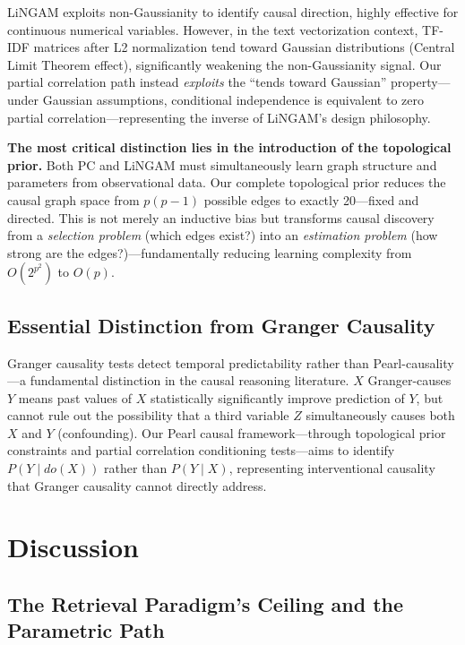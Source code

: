 \documentclass[11pt,a4paper]{article}
\begin{document}
LiNGAM exploits non-Gaussianity to identify causal direction, highly effective for continuous numerical variables. However, in the text vectorization context, TF-IDF matrices after L2 normalization tend toward Gaussian distributions (Central Limit Theorem effect), significantly weakening the non-Gaussianity signal. Our partial correlation path instead \textit{exploits} the ``tends toward Gaussian'' property---under Gaussian assumptions, conditional independence is equivalent to zero partial correlation---representing the inverse of LiNGAM's design philosophy.

\textbf{The most critical distinction lies in the introduction of the topological prior.} Both PC and LiNGAM must simultaneously learn graph structure and parameters from observational data. Our complete topological prior reduces the causal graph space from \(p(p-1)\) possible edges to exactly 20---fixed and directed. This is not merely an inductive bias but transforms causal discovery from a \textit{selection problem} (which edges exist?) into an \textit{estimation problem} (how strong are the edges?)---fundamentally reducing learning complexity from \(O(2^{p^2})\) to \(O(p)\).

\subsection{Essential Distinction from Granger Causality}

Granger causality tests detect temporal predictability rather than Pearl-causality---a fundamental distinction in the causal reasoning literature. \(X\) Granger-causes \(Y\) means past values of \(X\) statistically significantly improve prediction of \(Y\), but cannot rule out the possibility that a third variable \(Z\) simultaneously causes both \(X\) and \(Y\) (confounding). Our Pearl causal framework---through topological prior constraints and partial correlation conditioning tests---aims to identify \(P(Y \mid do(X))\) rather than \(P(Y \mid X)\), representing interventional causality that Granger causality cannot directly address.

\section{Discussion}
\label{sec:discussion}

\subsection{The Retrieval Paradigm's Ceiling and the Parametric Path}
\end{document}
